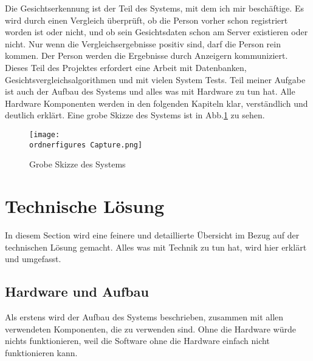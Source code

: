 Die Gesichtserkennung ist der Teil des Systems, mit dem ich mir beschäftige.
Es wird durch einen Vergleich überprüft, ob die Person vorher schon registriert worden ist oder nicht, und ob sein Gesichtsdaten schon am Server existieren oder nicht. Nur wenn die Vergleichsergebnisse positiv sind, darf die Person rein kommen.
Der Person werden die Ergebnisse durch Anzeigern kommuniziert. Dieses Teil des Projektes erfordert eine Arbeit mit Datenbanken, Gesichtsvergleichsalgorithmen und mit vielen System Tests. Teil meiner Aufgabe ist auch der Aufbau des Systems und alles was mit Hardware zu tun hat. Alle Hardware Komponenten werden in den folgenden Kapiteln klar, verständlich und deutlich erklärt. Eine grobe Skizze des Systems ist in Abb.\ref{fig:grobe_Skizze} zu sehen.
\begin{figure}[H]
	\texttt{[image: \\ordnerfigures Capture.png]}
	\caption{Grobe Skizze des Systems}
	\label{fig:grobe_Skizze}
\end{figure}
\section{Technische Lösung}
In diesem Section wird eine feinere und detaillierte Übersicht im Bezug auf der technischen Lösung gemacht. Alles was mit Technik zu tun hat, wird hier erklärt und umgefasst.
\subsection{Hardware und Aufbau}
Als erstens wird der Aufbau des Systems beschrieben, zusammen mit allen verwendeten Komponenten, die zu verwenden sind. Ohne die Hardware würde nichts funktionieren, weil die Software ohne die Hardware einfach nicht funktionieren kann.
